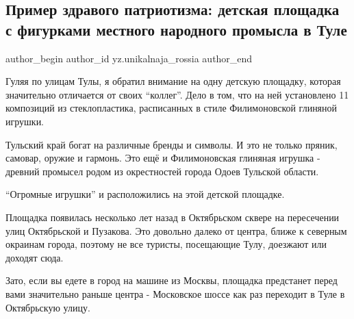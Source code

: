  
 
 
 
 
 
\subsection{Пример здравого патриотизма: детская площадка с фигурками местного народного промысла в Туле}
\label{sec:30_01_2022.yz.unikalnaja_rossia.1.detskaja_ploschadka_tula}
 
\ifcmt
 author_begin
   author_id yz.unikalnaja_rossia
 author_end
\fi

Гуляя по улицам Тулы, я обратил внимание на одну детскую площадку, которая
значительно отличается от своих \enquote{коллег}. Дело в том, что на ней установлено 11
композиций из стеклопластика, расписанных в стиле Филимоновской глиняной
игрушки.

Тульский край богат на различные бренды и символы. И это не только пряник,
самовар, оружие и гармонь. Это ещё и Филимоновская глиняная игрушка - древний
промысел родом из окрестностей города Одоев Тульской области.

\enquote{Огромные игрушки} и расположились на этой детской площадке.

Площадка появилась несколько лет назад в Октябрьском сквере на пересечении улиц
Октябрьской и Пузакова. Это довольно далеко от центра, ближе к северным
окраинам города, поэтому не все туристы, посещающие Тулу, доезжают или доходят
сюда.

Зато, если вы едете в город на машине из Москвы, площадка предстанет перед вами
значительно раньше центра - Московское шоссе как раз переходит в Туле в
Октябрьскую улицу.


